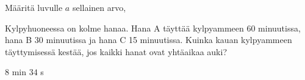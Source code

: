 \begin{tehtavasivu}
\begin{tehtava}
Määritä luvulle $a$ sellainen arvo, 
  \begin{alakohdat}
  \end{alakohdat}
\begin{vastaus}
   \begin{alakohdat}
      \end{alakohdat}
\end{vastaus}
\end{tehtava}

\begin{tehtava}
Kylpyhuoneessa on kolme hanaa. Hana A täyttää kylpyammeen 60 minuutissa, hana B 30 minuutissa ja hana C 15 minuutissa. Kuinka kauan kylpyammeen täyttymisessä kestää, jos kaikki hanat ovat yhtäaikaa auki?
\begin{vastaus}
$8$ min $34$ s
\end{vastaus}
\end{tehtava}


\end{tehtavasivu}
